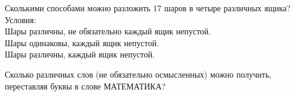 %
%


\begin{problems}

\item
Сколькими способами можно разложить 17 шаров в четыре различных ящика?
Условия:
\\
\sbp Шары различны, не обязательно каждый ящик непустой.
\\
\sbp Шары одинаковы, каждый ящик непустой.
\\
\sbp Шары различны, каждый ящик непустой.

\item
Сколько различных слов (не обязательно осмысленных) можно получить, переставляя
буквы в слове МАТЕМАТИКА?


\end{problems}

